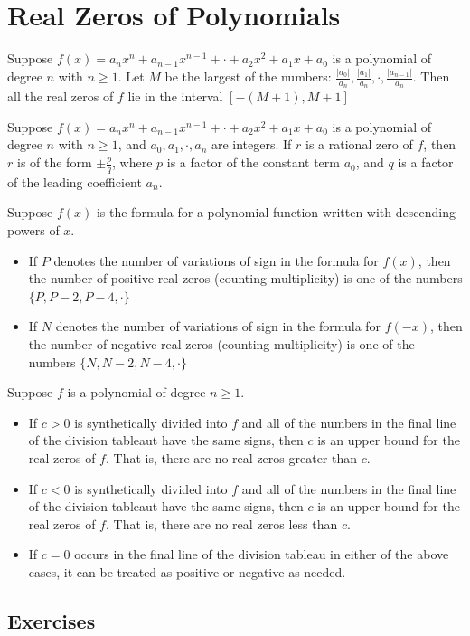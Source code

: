 \section{Real Zeros of Polynomials}

\begin{theorem}
    Suppose $f(x) = a_n x^n + a_{n-1}x^{n-1} + \cdot + a_2x^2 + a_1x + a_0$ is a polynomial of degree $n$ with $n \geq 1$. Let $M$ be the largest of the numbers: $\frac{|a_0|}{a_n}, \frac{|a_1|}{a_n}, \cdot, \frac{|a_{n-1}|}{a_n}$. Then all the real zeros of $f$ lie in the interval $[-(M+1), M+1]$
\end{theorem}

\begin{theorem}
    Suppose $f(x)= a_n x^n + a_{n-1}x^{n-1} + \cdot + a_2x^2 + a_1x + a_0$ is a polynomial of degree $n$ with $n \geq 1$, and $a_0, a_1, \cdot, a_n$ are integers. If $r$ is a rational zero of $f$, then $r$ is of the form $\pm \frac{p}{q}$, where $p$ is a factor of the constant term $a_0$, and $q$ is a factor of the leading coefficient $a_n$.
\end{theorem}

\begin{theorem}
    Suppose $f(x)$ is the formula for a polynomial function written with descending powers of $x$.
    \begin{itemize}
        \item If $P$ denotes the number of variations of sign in the formula for $f(x)$, then the number of positive real zeros (counting multiplicity) is one of the numbers $\{P, P-2, P-4, \cdot\}$
        \item If $N$ denotes the number of variations of sign in the formula for $f(-x)$, then the number of negative real zeros (counting multiplicity) is one of the numbers $\{N, N-2, N-4, \cdot\}$
    \end{itemize}
\end{theorem}

\begin{theorem}
    Suppose $f$ is a polynomial of degree $n\geq 1$.
    \begin{itemize}
        \item If $c>0$ is synthetically divided into $f$ and all of the numbers in the final line of the division tableaut have the same signs, then $c$ is an upper bound for the real zeros of $f$. That is, there are no real zeros greater than $c$.
        \item If $c<0$ is synthetically divided into $f$ and all of the numbers in the final line of the division tableaut have the same signs, then $c$ is an upper bound for the real zeros of $f$. That is, there are no real zeros less than $c$.
        \item If $c=0$ occurs in the final line of the division tableau in either of the above cases, it can be treated as positive or negative as needed.
    \end{itemize}
\end{theorem}

\subsection{Exercises}
